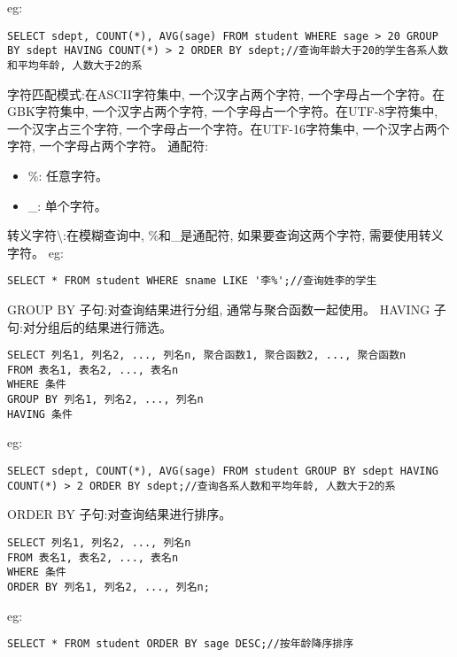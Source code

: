 eg:
\begin{lstlisting}
SELECT sdept, COUNT(*), AVG(sage) FROM student WHERE sage > 20 GROUP BY sdept HAVING COUNT(*) > 2 ORDER BY sdept;//查询年龄大于20的学生各系人数和平均年龄, 人数大于2的系
\end{lstlisting}
字符匹配模式:在ASCII字符集中, 一个汉字占两个字符, 一个字母占一个字符。在GBK字符集中, 一个汉字占两个字符, 一个字母占一个字符。在UTF-8字符集中, 一个汉字占三个字符, 一个字母占一个字符。在UTF-16字符集中, 一个汉字占两个字符, 一个字母占两个字符。
通配符:
\begin{itemize}
    \item \%: 任意字符。
    \item \_: 单个字符。
\end{itemize}
转义字符\textbackslash:在模糊查询中, \%和\_是通配符, 如果要查询这两个字符, 需要使用转义字符。
eg:
\begin{lstlisting}
SELECT * FROM student WHERE sname LIKE '李%';//查询姓李的学生
\end{lstlisting}

GROUP BY 子句:对查询结果进行分组, 通常与聚合函数一起使用。
HAVING 子句:对分组后的结果进行筛选。
\begin{lstlisting}
SELECT 列名1, 列名2, ..., 列名n, 聚合函数1, 聚合函数2, ..., 聚合函数n
FROM 表名1, 表名2, ..., 表名n
WHERE 条件
GROUP BY 列名1, 列名2, ..., 列名n
HAVING 条件
\end{lstlisting}
eg:
\begin{lstlisting}
SELECT sdept, COUNT(*), AVG(sage) FROM student GROUP BY sdept HAVING COUNT(*) > 2 ORDER BY sdept;//查询各系人数和平均年龄, 人数大于2的系
\end{lstlisting}
ORDER BY 子句:对查询结果进行排序。
\begin{lstlisting}
SELECT 列名1, 列名2, ..., 列名n
FROM 表名1, 表名2, ..., 表名n
WHERE 条件
ORDER BY 列名1, 列名2, ..., 列名n;
\end{lstlisting}
eg:
\begin{lstlisting}
SELECT * FROM student ORDER BY sage DESC;//按年龄降序排序
\end{lstlisting}
